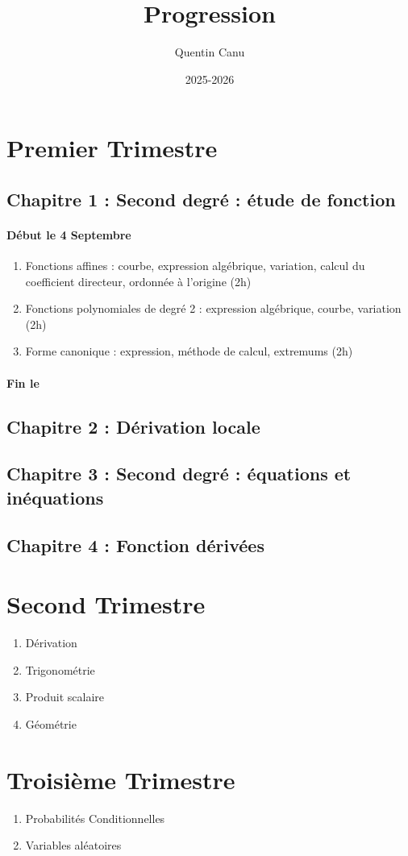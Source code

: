 \documentclass{article}
\title{Progression}
\author{Quentin Canu}
\date{2025-2026}
\begin{document}
\maketitle
\section{Premier Trimestre}
\subsection*{Chapitre 1 : Second degré : étude de fonction}
\paragraph*{Début le 4 Septembre}
\begin{enumerate}
\item Fonctions affines : courbe, expression algébrique, variation, calcul du coefficient directeur, ordonnée à l'origine (2h)
\item Fonctions polynomiales de degré 2 : expression algébrique, courbe, variation (2h)
\item Forme canonique : expression, méthode de calcul, extremums (2h)
\end{enumerate}
\paragraph*{Fin le}
\subsection*{Chapitre 2 : Dérivation locale}
\subsection*{Chapitre 3 : Second degré : équations et inéquations}
\subsection*{Chapitre 4 : Fonction dérivées}
\section{Second Trimestre}
\begin{enumerate}[resume]
\item Dérivation
\item Trigonométrie
\item Produit scalaire
\item Géométrie
\end{enumerate}
\section{Troisième Trimestre}
\begin{enumerate}[resume]
\item Probabilités Conditionnelles
\item Variables aléatoires
\end{enumerate}
\end{document}
